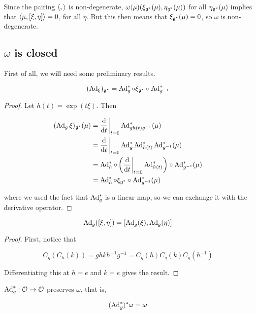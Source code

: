 \documentclass{article}
\begin{document}
Since the pairing \(\left\langle , \right\rangle\) is non-degenerate, \(\omega(\mu)(\xi_{\mathfrak{g}^*}(\mu), \eta_{\mathfrak{g}^*}(\mu))\) for all \(\eta_{\mathfrak{g}^*}(\mu)\) implies that \(\left\langle \mu, [\xi, \eta] \right\rangle = 0\), for all \(\eta\). But this then means that \(\xi_{\mathfrak{g}^*}(\mu) = 0\), so \(\omega\) is non-degenerate.

\subsection{\(\omega\) is closed}

First of all, we will need some preliminary results.

\begin{lemma}
    \[(\operatorname{Ad}_\xi)_{\mathfrak{g}^*} = \operatorname{Ad}_g^* \circ \xi_{\mathfrak{g}^*} \circ \operatorname{Ad}_{g^{-1}}^*\]
\end{lemma}

\begin{proof}
    Let \(h(t) = \exp(t\xi)\). Then

    \begin{align*}
        (\operatorname{Ad}_g\xi)_{\mathfrak{g}^*}(\mu) &= \dv{t}\bigg\vert_{t=0}\operatorname{Ad}^*_{gh(t)g^{-1}}(\mu) \\
        &= \dv{t}\bigg\vert_{t=0}\operatorname{Ad}^*_g\operatorname{Ad}^*_{h(t)}\operatorname{Ad}^*_{g^{-1}}(\mu) \\
        &= \operatorname{Ad}_h^* \circ \left(\dv{t}\bigg\vert_{t=0}\operatorname{Ad}_{h(t)}^*\right) \circ \operatorname{Ad}_{g^{-1}}^*(\mu) \\
        &= \operatorname{Ad}_h^* \circ \xi_{\mathfrak{g}^*} \circ \operatorname{Ad}_{g^{-1}}^*(\mu)
    \end{align*}

    where we used the fact that \(\operatorname{Ad}_g^*\) is a linear map, so we can exchange it with the derivative operator.
\end{proof}

\begin{lemma}
    \[\operatorname{Ad}_g([\xi, \eta]) = [\operatorname{Ad}_g(\xi), \operatorname{Ad}_g(\eta)]\]
\end{lemma}

\begin{proof}
    First, notice that

    \[C_g(C_h(k)) = ghkh^{-1}g^{-1}= C_g(h)C_g(k)C_g(h^{-1})\]

    Differentiating this at \(h = e\) and \(k = e\) gives the result.
\end{proof}

\begin{lemma}
    \(\operatorname{Ad}_g^* : \mathcal{O} \to \mathcal{O}\) preserves \(\omega\), that is,

    \[(\operatorname{Ad}_g^*)^*\omega = \omega\]
\end{lemma}
\end{document}
